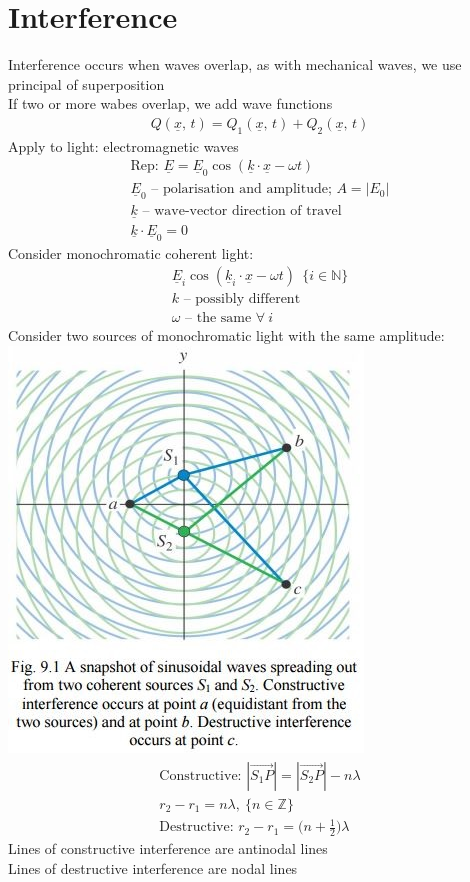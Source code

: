 \documentclass[a4paper, 11pt, fleqn, normalem]{report}
\begin{document}
\section{Interference}
Interference occurs when waves overlap, as with mechanical waves, we use principal of superposition \\
If two or more wabes overlap, we add wave functions
\begin{gather*}
    Q(\underline{x},\,t) = Q_{1}(\underline{x},\,t) + Q_{2}(\underline{x},\,t)
\end{gather*}
Apply to light: electromagnetic waves
\begin{gather*}
    \text{Rep: }\underline{E} = \underline{E}_{0}\cos{(\underline{k}\cdot\underline{x} - \omega t)} \\
    \underline{E}_{0}\text{ -- polarisation and amplitude; }A = |E_{0}| \\
    \underline{k}\text{ -- wave-vector direction of travel} \\
    \underline{k}\cdot\underline{E}_{0} = 0
\end{gather*}
Consider monochromatic coherent light:
\begin{gather*}
    \underline{E}_{i}\cos{(\underline{k}_{i}\cdot\underline{x} - \omega t)}~~\{i \in \mathbb{N}\} \\
    k\text{ -- possibly different} \\
    \omega\text{ -- the same }\forall ~i
\end{gather*}
Consider two sources of monochromatic light with the same amplitude: \\
\includegraphics{Construc.jpg}
\begin{gather*}
    \text{Constructive: }|\overrightarrow{S_{1}P}| = |\overrightarrow{S_{2}P}| - n\lambda \\
    r_{2} - r_{1} = n\lambda, ~\{n \in \mathbb{Z}\} \\
    \text{Destructive: }r_{2} - r_{1} = \Big(n + \frac{1}{2}\Big)\lambda
\end{gather*}
Lines of constructive interference are antinodal lines \\
Lines of destructive interference are nodal lines
\end{document}
